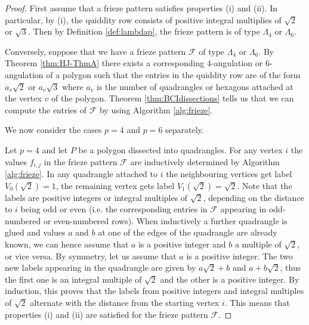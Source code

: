 \documentclass[11pt,a4paper]{amsart}
\theoremstyle{definition}
\numberwithin{equation}{section}
\begin{document}
\begin{proof}
First assume that a frieze pattern satisfies properties (i) and (ii). In particular, by (i), the quiddity row
consists of positive integral multiplies of $\sqrt{2}$ or $\sqrt{3}$. Then by Definition \ref{def:lambdap},
the frieze pattern is of type $\Lambda_4$ or $\Lambda_6$. 
\smallskip

Conversely, suppose that we have a frieze pattern $\mathcal{F}$ of type $\Lambda_4$ or $\Lambda_6$. 
By Theorem \ref{thm:HJ-ThmA} there exists a corresponding 4-angulation or 6-angulation of a polygon
such that the entries in the quiddity row are of the form $a_v\sqrt{2}$ or $a_v\sqrt{3}$ where $a_v$ is the 
number of quadrangles or hexagons attached at the vertex $v$ of the polygon. 
Theorem \ref{thm:BCIdissections} tells us that we can compute the entries of $\mathcal{F}$
by using Algorithm \ref{alg:frieze}. 

We now consider the cases $p=4$ and $p=6$ separately. 

Let $p=4$ and let $P$ be a polygon dissected into quadrangles. For any vertex $i$ the values $f_{i,j}$
in the frieze pattern $\mathcal{F}$ are inductively determined by Algorithm \ref{alg:frieze}. In any 
quadrangle attached to $i$ the neighbouring vertices get label $V_0(\sqrt{2})=1$, the remaining vertex 
gets label $V_1(\sqrt{2})=\sqrt{2}$. Note that the labels are positive integers or integral multiples 
of $\sqrt{2}$, depending on the distance to $i$ being odd or even (i.e. the corresponding entries in
$\mathcal{F}$ appearing in odd-numbered or even-numbered rows). When inductively a further 
quadrangle is glued and values $a$ and $b$ at one of the edges of the quadrangle are already known, we
can hence assume that $a$ is a positive integer and $b$ a multiple of $\sqrt{2}$, or vice versa. 
By symmetry, let us assume that $a$ is a positive integer. 
The two new labels appearing in the quadrangle are given by 
$a\sqrt{2}+b$ and $a+b\sqrt{2}$, thus the first one is an integral multiple of $\sqrt{2}$ and the other 
is a positive integer. By induction, this proves that the labels from positive integers and integral
multiples of $\sqrt{2}$ alternate with the distance from the starting vertex $i$. This means that 
 properties (i) and (ii) are satisfied for the frieze pattern $\mathcal{F}$. 
 \smallskip
 

\end{proof}
\end{document}
